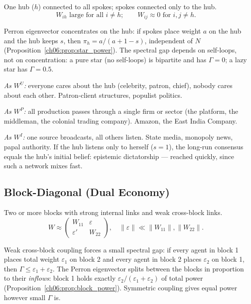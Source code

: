 \documentclass[../structural_economics_book.tex]{subfiles}
\begin{document}
One hub ($h$) connected to all spokes; spokes connected only to the hub.
\begin{equation}
W_{ih} \text{ large for all } i \neq h; \qquad W_{ij} \approx 0 \text{ for } i, j \neq h.
\end{equation}

Perron eigenvector concentrates on the hub: if spokes place weight $a$ on the hub and the hub keeps $s$, then $\pi_h = a/(a+1-s)$, independent of $N$ (Proposition~\ref{ch06:prop:star_power}). The spectral gap depends on self-loops, not on concentration: a pure star (no self-loops) is bipartite and has $\Gamma = 0$; a lazy star has $\Gamma = 0.5$.

\textit{As $W^U$:} everyone cares about the hub (celebrity, patron, chief), nobody cares about each other. Patron-client structures, populist politics.

\textit{As $W^P$:} all production passes through a single firm or sector (the platform, the middleman, the colonial trading company). Amazon, the East India Company.

\textit{As $W^I$:} one source broadcasts, all others listen. State media, monopoly news, papal authority. If the hub listens only to herself ($s = 1$), the long-run consensus equals the hub's initial belief: epistemic dictatorship --- reached quickly, since such a network mixes fast.


\subsection{Block-Diagonal (Dual Economy)}

Two or more blocks with strong internal links and weak cross-block links.
\begin{equation}
W \approx \begin{pmatrix} W_{11} & \varepsilon \\ \varepsilon' & W_{22} \end{pmatrix}, \quad \|\varepsilon\| \ll \|W_{11}\|, \|W_{22}\|.
\end{equation}

Weak cross-block coupling forces a small spectral gap: if every agent in block 1 places total weight $\varepsilon_1$ on block 2 and every agent in block 2 places $\varepsilon_2$ on block 1, then $\Gamma \leq \varepsilon_1 + \varepsilon_2$. The Perron eigenvector splits between the blocks in proportion to their \textit{inflows}: block 1 holds exactly $\varepsilon_2/(\varepsilon_1 + \varepsilon_2)$ of total power (Proposition~\ref{ch06:prop:block_power}). Symmetric coupling gives equal power however small $\Gamma$ is.
\end{document}
